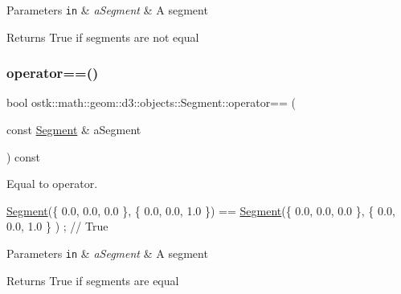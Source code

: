 \begin{DoxyParams}[1]{Parameters}
\mbox{\tt in}  & {\em a\+Segment} & A segment \\
\hline
\end{DoxyParams}
\begin{DoxyReturn}{Returns}
True if segments are not equal 
\end{DoxyReturn}
\mbox{\label{classostk_1_1math_1_1geom_1_1d3_1_1objects_1_1_segment_ae19c34b4b4cf1ff5bb1be0835c7c064e}} 
\subsubsection{\texorpdfstring{operator==()}{operator==()}}
{\footnotesize\ttfamily bool ostk\+::math\+::geom\+::d3\+::objects\+::\+Segment\+::operator== (\begin{DoxyParamCaption}\item[{const \hyperlink{classostk_1_1math_1_1geom_1_1d3_1_1objects_1_1_segment}{Segment} \&}]{a\+Segment }\end{DoxyParamCaption}) const}



Equal to operator. 


\begin{DoxyCode}
\hyperlink{classostk_1_1math_1_1geom_1_1d3_1_1objects_1_1_segment_aa2cb60ce06335a5f76120c658219494c}{Segment}(\{ 0.0, 0.0, 0.0 \}, \{ 0.0, 0.0, 1.0 \}) == \hyperlink{classostk_1_1math_1_1geom_1_1d3_1_1objects_1_1_segment_aa2cb60ce06335a5f76120c658219494c}{Segment}(\{ 0.0, 0.0, 0.0 \}, \{ 0.0, 0.0, 1.0 \}
      ) ; \textcolor{comment}{// True}
\end{DoxyCode}



\begin{DoxyParams}[1]{Parameters}
\mbox{\tt in}  & {\em a\+Segment} & A segment \\
\hline
\end{DoxyParams}
\begin{DoxyReturn}{Returns}
True if segments are equal 
\end{DoxyReturn}
\mbox{\label{classostk_1_1math_1_1geom_1_1d3_1_1objects_1_1_segment_a2c2029b6b84e984532f98dbd9a10ff1b}} 
